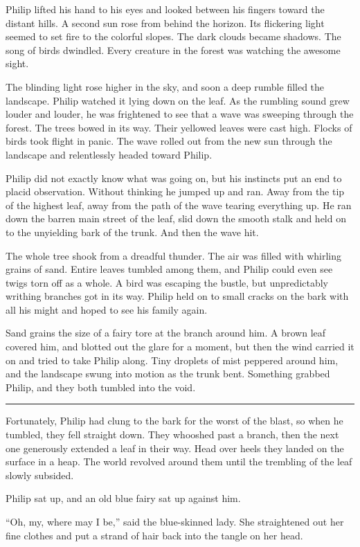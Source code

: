 \documentclass[10pt, draft]{memoir}
\renewcommand{\pfbreakdisplay}{\bigskip \ding{166} \bigskip}
\newcommand{\secbreak}{\fancybreak{\pfbreakdisplay}}
\begin{document}
Philip lifted his hand to his eyes and looked between his fingers toward the
distant hills. A second sun rose from behind the horizon. Its flickering light
seemed to set fire to the colorful slopes. The dark clouds became shadows. The
song of birds dwindled. Every creature in the forest was watching the awesome
sight.

The blinding light rose higher in the sky, and soon a deep rumble filled the
landscape. Philip watched it lying down on the leaf. As the rumbling sound grew
louder and louder, he was frightened to see that a wave was sweeping through
the forest. The trees bowed in its way. Their yellowed leaves were cast high.
Flocks of birds took flight in panic. The wave rolled out from the new sun
through the landscape and relentlessly headed toward Philip.

Philip did not exactly know what was going on, but his instincts put an end to
placid observation. Without thinking he jumped up and ran. Away from the tip of
the highest leaf, away from the path of the wave tearing everything up. He ran
down the barren main street of the leaf, slid down the smooth stalk and held on
to the unyielding bark of the trunk. And then the wave hit.

The whole tree shook from a dreadful thunder. The air was filled with whirling
grains of sand. Entire leaves tumbled among them, and Philip could even see
twigs torn off as a whole. A bird was escaping the bustle, but unpredictably
writhing branches got in its way. Philip held on to small cracks on the bark
with all his might and hoped to see his family again.

Sand grains the size of a fairy tore at the branch around him. A brown leaf
covered him, and blotted out the glare for a moment, but then the wind carried
it on and tried to take Philip along. Tiny droplets of mist peppered around
him, and the landscape swung into motion as the trunk bent. Something grabbed
Philip, and they both tumbled into the void.

\secbreak

Fortunately, Philip had clung to the bark for the worst of the blast, so when
he tumbled, they fell straight down. They whooshed past a branch, then the next
one generously extended a leaf in their way. Head over heels they landed on the
surface in a heap. The world revolved around them until the trembling of the
leaf slowly subsided.

Philip sat up, and an old blue fairy sat up against him.

``Oh, my, where may I be,'' said the blue-skinned lady. She straightened out
her fine clothes and put a strand of hair back into the tangle on her head.
\end{document}
